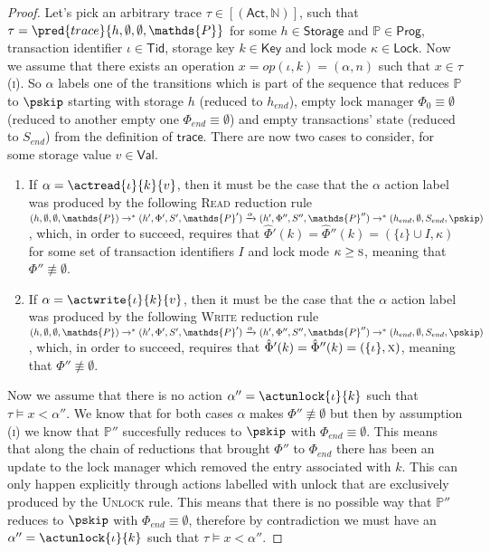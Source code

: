 \begin{proof}
Let's pick an arbitrary trace $\tau \in \mathsf{[(Act, \mathds{N})]}$, such that $\tau = \pred{trace}{h, \emptyset, \emptyset, \mathds{P}}$ for some $h \in \mathsf{Storage}$ and $\mathds{P} \in \mathsf{Prog}$, transaction identifier $\iota \in \mathsf{Tid}$, storage key $k \in \mathsf{Key}$ and lock mode $\kappa \in \mathsf{Lock}$. Now we assume that there exists an operation $x = op(\iota, k) = (\alpha, n)$ such that $x \in \tau$ (\textsc{i}). So $\alpha$ labels one of the transitions which is part of the sequence that reduces $\mathds{P}$ to $\pskip$ starting with storage $h$ (reduced to $h_{end}$), empty lock manager $\Phi_0 \equiv \emptyset$ (reduced to another empty one $\Phi_{end} \equiv \emptyset$) and empty transactions' state (reduced to $S_{end}$) from the definition of $\mathsf{trace}$. There are now two cases to consider, for some storage value $v \in \mathsf{Val}$.
\begin{enumerate}
\item If $\alpha = \actread{\iota}{k}{v}$, then it must be the case that the $\alpha$ action label was produced by the following \textsc{Read} reduction rule $(h, \emptyset, \emptyset, \mathds{P}) \rightarrow^* (h', \Phi', S', \mathds{P}') \xrightarrow{\alpha} (h', \Phi'', S'', \mathds{P}'') \rightarrow^* (h_{end}, \emptyset, S_{end}, \pskip)$, which, in order to succeed, requires that $\hat{\Phi}'(k) = \hat{\Phi}''(k) = (\{ \iota \} \cup I, \kappa)$ for some set of transaction identifiers $I$ and lock mode $\kappa \geq \textsc{s}$, meaning that $\Phi'' \not\equiv \emptyset$.
\item If $\alpha = \actwrite{\iota}{k}{v}$, then it must be the case that the $\alpha$ action label was produced by the following \textsc{Write} reduction rule $(h, \emptyset, \emptyset, \mathds{P}) \rightarrow^* (h', \Phi', S', \mathds{P}') \xrightarrow{\alpha} (h', \Phi'', S'', \mathds{P}'') \rightarrow^* (h_{end}, \emptyset, S_{end}, \pskip)$, which, in order to succeed, requires that $\hat{\Phi}'(k) = \hat{\Phi}''(k) = (\{ \iota \}, \textsc{x})$, meaning that $\Phi'' \not\equiv \emptyset$.
\end{enumerate}

Now we assume that there is no action $\alpha'' = \actunlock{\iota}{k}$ such that $\tau \vDash x < \alpha''$. We know that for both cases $\alpha$ makes $\Phi'' \not\equiv \emptyset$ but then by assumption (\textsc{i}) we know that $\mathds{P}''$ succesfully reduces to $\pskip$ with $\Phi_{end} \equiv \emptyset$. This means that along the chain of reductions that brought $\Phi''$ to $\Phi_{end}$ there has been an update to the lock manager which removed the entry associated with $k$. This can only happen explicitly through actions labelled with \textsf{unlock} that are exclusively produced by the \textsc{Unlock} rule. This means that there is no possible way that $\mathds{P}''$ reduces to $\pskip$ with $\Phi_{end} \equiv \emptyset$, therefore by contradiction we must have an $\alpha'' = \actunlock{\iota}{k}$ such that $\tau \vDash x < \alpha''$.
\end{proof}

